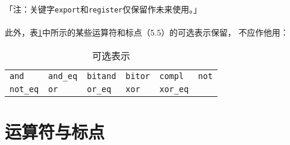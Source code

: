 「注：关键字\texttt{export}和\texttt{register}仅保留作未来使用。」

\paragraph{}
此外，表\ref{tab:alt-rep-op-punc}中所示的某些运算符和标点（5.5）的可选表示保留，
不应作他用：

\begin{table}[h!]
  \centering
  \caption{可选表示}
  \begin{tabular}{|llllll|}
    \hline
    \texttt{and}       & \texttt{and\_eq} & \texttt{bitand} & \texttt{bitor}   &
      \texttt{compl}   & \texttt{not}                                         \\
    \texttt{not\_eq}   & \texttt{or}      & \texttt{or\_eq} & \texttt{xor}     &
      \texttt{xor\_eq} &                                                      \\
    \hline
  \end{tabular}
  \label{tab:alt-rep-op-punc}
\end{table}

\section{运算符与标点}
